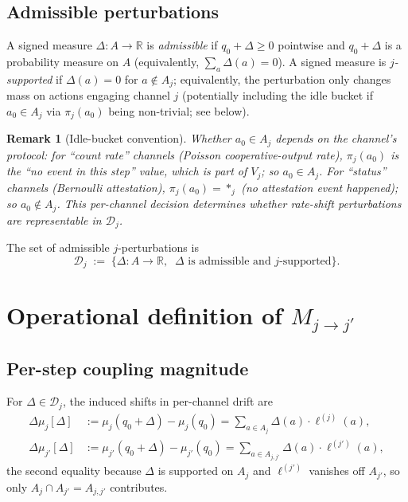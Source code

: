\documentclass{article}
\newtheorem{remark}{Remark}
\begin{document}
\subsection{Admissible perturbations}

A signed measure $\Delta: A \to \mathbb{R}$ is \emph{admissible} if
$q_0 + \Delta \geq 0$ pointwise and $q_0 + \Delta$ is a probability
measure on $A$ (equivalently, $\sum_a \Delta(a) = 0$).  A signed
measure is \emph{$j$-supported} if $\Delta(a) = 0$ for $a \notin
A_j$; equivalently, the perturbation only changes mass on actions
engaging channel $j$ (potentially including the idle bucket if
$a_0 \in A_j$ via $\pi_j(a_0)$ being non-trivial; see below).

\begin{remark}[Idle-bucket convention]
\label{rem:idle}
Whether $a_0 \in A_j$ depends on the channel's protocol: for
``count rate'' channels (Poisson cooperative-output rate),
$\pi_j(a_0)$ is the ``no event in this step'' value, which is part
of $V_j$; so $a_0 \in A_j$.  For ``status'' channels (Bernoulli
attestation), $\pi_j(a_0) = *_j$ (no attestation event happened);
so $a_0 \notin A_j$.  This per-channel decision determines whether
rate-shift perturbations are representable in $\mathcal{D}_j$.
\end{remark}

The set of admissible $j$-perturbations is
\begin{equation}
  \mathcal{D}_j \;:=\; \{\Delta : A \to \mathbb{R}, \;\;\Delta
  \text{ is admissible and $j$-supported}\}.
\end{equation}

\section{Operational definition of \texorpdfstring{$M_{j \to j'}$}{M\_jj'}}

\subsection{Per-step coupling magnitude}

For $\Delta \in \mathcal{D}_j$, the induced shifts in per-channel
drift are
\begin{align}
  \Delta\mu_j[\Delta] &:= \mu_j(q_0 + \Delta) - \mu_j(q_0)
    = \sum_{a \in A_j} \Delta(a) \cdot \ell^{(j)}(a), \\
  \Delta\mu_{j'}[\Delta] &:= \mu_{j'}(q_0 + \Delta) - \mu_{j'}(q_0)
    = \sum_{a \in A_{j, j'}} \Delta(a) \cdot \ell^{(j')}(a),
\end{align}
the second equality because $\Delta$ is supported on $A_j$ and
$\ell^{(j')}$ vanishes off $A_{j'}$, so only $A_j \cap A_{j'} =
A_{j,j'}$ contributes.
\end{document}
